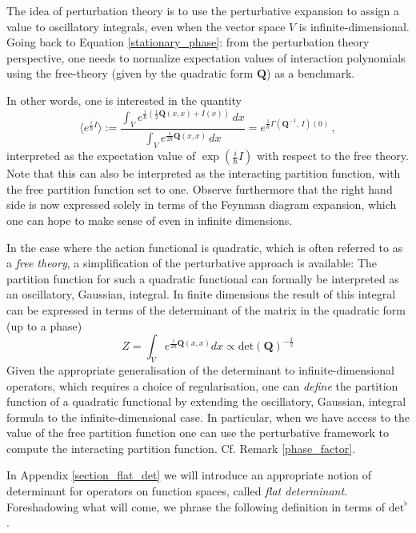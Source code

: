 \documentclass[reqno]{amsart}
\theoremstyle{definition}
\theoremstyle{remark}
\newcommand{\h}{\hbar}
\renewcommand{\det}{\mathrm{det}^\flat}
\begin{document}
The idea of perturbation theory is to use the perturbative expansion to assign a value to oscillatory integrals, even when the vector space $V$ is infinite-dimensional. Going back to Equation \eqref{stationary_phase}: from the perturbation theory perspective, one needs to normalize expectation values of interaction polynomials using the free-theory (given by the quadratic form $\mathbf{Q}$) as a benchmark.


In other words, one is interested in the quantity
\begin{equation}
\label{expectation_value_finite}
    \biggl\langle e^{\frac{i}{\hbar}I} \biggr\rangle := \frac{\int_V e^{\frac{i}{\h}(\frac{1}{2}\mathbf{Q}(x,x)+I(x))}\,dx}{\int_V e^{\frac{i}{2\h}\mathbf{Q}(x,x)}\,dx} = e^{\frac{1}{\h}\Gamma(\mathbf{Q}^{-1},\,I)(0)}\,,
\end{equation}
interpreted as the expectation value of $\exp(\frac{i}{\hbar}I)$ with respect to the free theory. Note that this can also be interpreted as the interacting partition function, with the free partition function set to one. Observe furthermore that the right hand side is now expressed solely in terms of the Feynman diagram expansion, which one can hope to make sense of even in infinite dimensions.



\begin{rmk}
In the case where the action functional is quadratic, which is often referred to as a \emph{free theory}, a simplification of the perturbative approach is available: The partition function for such a quadratic functional can formally be interpreted as an oscillatory, Gaussian, integral. In finite dimensions the result of this integral can be expressed in terms of the determinant of the matrix in the quadratic form (up to a phase)
\[
Z=\int_V e^{\frac{i}{2\hbar}\mathbf{Q}(x,x)}dx \propto \mathrm{det}(\mathbf{Q})^{-\frac12}
\]
Given the appropriate generalisation of the determinant to infinite-dimensional operators, which requires a choice of regularisation, one can \emph{define} the partition function of a quadratic functional by extending the oscillatory, Gaussian, integral formula to the infinite-dimensional case. In particular, when we have access to the value of the free partition function one can use the perturbative framework to compute the interacting partition function.  Cf. Remark \ref{phase_factor}.
\end{rmk}


In Appendix \ref{section_flat_det} we will introduce an appropriate notion of determinant for operators on function spaces, called \emph{flat determinant}. Foreshadowing what will come, we phrase the following definition in terms of $\det$. 
\end{document}
